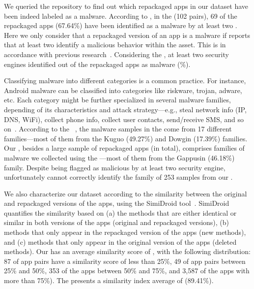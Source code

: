 We queried the \vt repository to find out which repackaged apps in our
dataset have been indeed labeled as a malware.
According to \vt, in the \sds (102 pairs),
69 of the repackaged apps (67.64\%) have been identified as a malware by at least two
\ses. Here we only consider that a repackaged version of an app is a malware if \vt reports that at least
two \ses identify a malicious behavior within the asset. This is in accordance with previous research~\cite{vt-label,DBLP:journals/ese/KhanmohammadiEH19}.
Considering the \cds, at least two security engines identified \malwares out of the \apps repackaged apps as malware (\malwaresP\%).

Classifying malware into different categories is a common practice. For instance, Android malware can be classified into categories
like riskware, trojan, adware, etc. Each category might be further specialized in several malware families, depending of its
characteristics and attack strategy---e.g., steal network info (IP, DNS, WiFi), collect phone info,
collect user contacts, send/receive SMS, and so on~\cite{DBLP:conf/iccns/RahaliLKTGM20}.
According to the
\avt~\cite{avclass2-paper}, the malware samples in the \sds come from 17 different families---most of them from the Kuguo (49.27\%) and Dowgin (17.39\%) families.  
Our \cds, besides a large sample of repackaged apps (\apps in total),
comprises  families of malware we collected using the \avt---most
of them from the Gappusin (46.18\%) family. Despite being flagged as malicious by at least two security engine, unfortunately \vt cannot correctly identify the family of 253 samples from our \cds.

We also characterize our dataset according to the similarity
between the original and repackaged versions of the apps, using the  
SimiDroid tool~\cite{DBLP:conf/trustcom/0029BK17}. SimiDroid quantifies the similarity
based on (a) the methods that are either identical or similar in both versions of the apps (original and repackaged versions),
(b) methods that only appear in the repackaged version of the apps (new methods), and (c) methods that only appear in the
original version of the apps (deleted methods).
Our \cds has an average similarity score of , with the following distribution: 87 of
app pairs have a similarity score of less than 25\%, 49 of app pairs
between 25\% and 50\%,  353 of the apps between 50\% and 75\%,
and 3,587 of the apps with more than 75\%). The \sds presents a similarity index average of (89.41\%).


